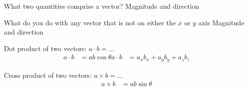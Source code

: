 \documentclass[avery5371,grid]{flashcards}
\begin{document}


\begin{flashcard}[Definition]{What two quantities comprise a vector?}
    Magnitude and direction
\end{flashcard}

\begin{flashcard}[Definition]{What do you do with any vector that is not on either the $x$ or $y$ axis}
    Magnitude and direction
\end{flashcard}


\begin{flashcard}[Definition]{Dot product of two vectors: $a\cdot b = \ldots$}
    \begin{align*}
        a\cdot b &= a b \cos\theta
        a\cdot b &= a_x b_x + a_y b_y + a_z b_z
    \end{align*}
\end{flashcard}

\begin{flashcard}[Definition]{Cross product of two vectors: $a\times b = \ldots$}
    \begin{align*}
        a \times b &= a b \sin\theta
    \end{align*}
\end{flashcard}
\end{document}
